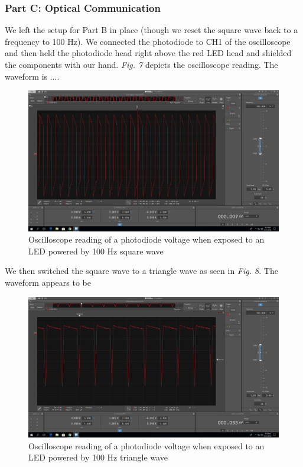 \documentclass[10pt]{article}
\begin{document}
\subsubsection{Part C: Optical Communication}
We left the setup for Part B in place (though we reset the square wave back to a frequency to 100 Hz). We connected the photodiode to CH1 of the oscilloscope and then held the photodiode head right above the red LED head and shielded the components with our hand. \textit{Fig. 7} depicts the oscilloscope reading. The waveform is ....
\begin{center}
	\begin{figure} [H]
		\centering
		\includegraphics[scale=0.22]{images/opticalsquare.png}
		\caption{Oscilloscope reading of a photodiode voltage when exposed to an LED powered by 100 Hz square wave}
	\end{figure}
\end{center}

We then switched the square wave to a triangle wave as seen in \textit{Fig. 8}. The waveform appears to be 
\begin{center}
	\begin{figure} [H]
		\centering
		\includegraphics[scale=0.22]{images/opticaltriangle.png}
		\caption{Oscilloscope reading of a photodiode voltage when exposed to an LED powered by 100 Hz triangle wave}
	\end{figure}
\end{center}
\end{document}
